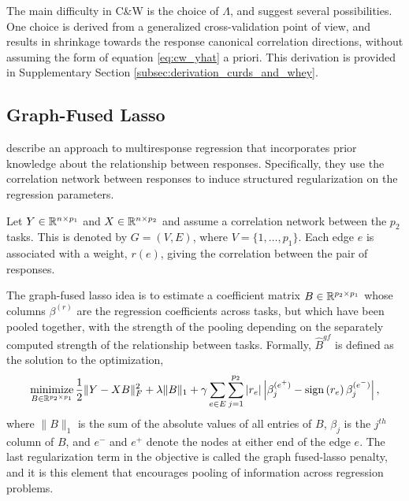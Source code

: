 \documentclass[14pt]{extarticle}
\begin{document}
The main difficulty in C\&W is the choice of $\Lambda$, and
\cite{breiman1997predicting} suggest several possibilities. One choice is
derived from a generalized cross-validation point of view, and results in
shrinkage towards the response canonical correlation directions, without
assuming the form of equation \ref{eq:cw_yhat} a priori. This derivation is
provided in Supplementary Section \ref{subsec:derivation_curds_and_whey}.

\subsection{Graph-Fused Lasso}
\label{subsec:graph_fused_lasso}

\cite{chen2010graph} describe an approach to multiresponse regression that
incorporates prior knowledge about the relationship between responses.
Specifically, they use the correlation network between responses to induce
structured regularization on the regression parameters.

Let $Y \in \mathbb{R}^{n \times p_{1}}$ and $X \in \mathbb{R}^{n \times p_{2}}$ and
assume a correlation network between the $p_{2}$ tasks. This is denoted by $G =
\left(V, E\right)$, where $V = \{1, \dots, p_{1}\}$. Each edge $e$ is associated
with a weight, $r\left(e\right)$, giving the correlation between the pair of
responses.

The graph-fused lasso idea is to estimate a coefficient matrix $B \in
\mathbb{R}^{p_{2} \times p_{1}}$ whose columns $\beta^{(r)}$ are the regression
coefficients across tasks, but which have been pooled together, with the
strength of the pooling depending on the separately computed strength of the
relationship between tasks. Formally, $\hat{B}^{gf}$ is defined as the solution
to the optimization,
\begin{align}
\mathop\mathrm{minimize}_{B \in \mathbb{R}^{p_{2} \times p_{1}}} \frac{1}{2}\|Y -
  XB\|_{F}^{2} + \lambda \|B\|_{1} + \gamma \sum_{e \in E} \sum_{j =
    1}^{p_{2}} \left|r_{e}\right|\left|\beta_{j}^{(e^{+})} -
      \mathop\mathrm{sign}\left(r_{e}\right) \beta^{(e^{-})}_{j}\right|, \label{eq:gflasso_obj}
\end{align}
where $\|B\|_{1}$ is the sum of the absolute values of all entries of $B$,
$\beta_j$ is the $j^{th}$ column of $B$, and $e^{-}$ and $e^{+}$ denote the
nodes at either end of the edge $e$. The last regularization term in the
objective is called the graph fused-lasso penalty, and it is this element that
encourages pooling of information across regression problems.
\end{document}
